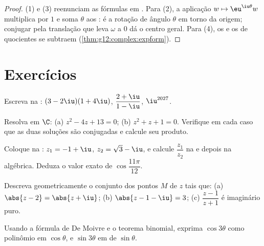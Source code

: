 \begin{proof}
(1) e (3) reenunciam as fórmulas em . Para (2), a aplicação
$w \mapsto \eu^{\iu\theta} w$ multiplica  por $1$ e soma $\theta$
aos : é a rotação de ângulo $\theta$ em torno da origem;
conjugar pela translação que leva $\omega$ a $0$ dá o centro geral. Para
(4), os  e os  de quocientes se subtraem
(\cref{thm:g12:complex:expform}).
\end{proof}

\section{Exercícios}

\begin{exercise}[$\star$]\label{exo:g12:complex:1}
Escreva na : $(3 - 2\iu)(1 + 4\iu)$, \quad
$\dfrac{2 + \iu}{1 - \iu}$, \quad $\iu^{2027}$.
\end{exercise}

\begin{exercise}[$\star$]\label{exo:g12:complex:2}
Resolva em $\C$: (a) $z^2 - 4z + 13 = 0$; (b) $z^2 + z + 1 = 0$. Verifique
em cada caso que as duas soluções são conjugadas e calcule seu produto.
\end{exercise}

\begin{exercise}[$\star$]\label{exo:g12:complex:3}
Coloque na : $z_1 = -1 + \iu$, $z_2 = \sqrt3 - \iu$, e
calcule $\dfrac{z_1}{z_2}$ na  e depois na algébrica.
Deduza o valor exato de $\cos\dfrac{11\pi}{12}$.
\end{exercise}

\begin{exercise}[$\star\star$]\label{exo:g12:complex:4}
Descreva geometricamente o conjunto dos pontos $M$ de  $z$ tais que:
(a) $\abs{z - 2} = \abs{z + \iu}$;\quad
(b) $\abs{z - 1 - \iu} = 3$;\quad
(c) $\dfrac{z - 1}{z + 1}$ é imaginário puro.
\end{exercise}

\begin{exercise}[$\star\star$]\label{exo:g12:complex:5}
Usando a fórmula de De Moivre e o teorema binomial, exprima
$\cos 3\theta$ como polinômio em $\cos\theta$, e $\sin 3\theta$ em 
de $\sin\theta$.
\end{exercise}

